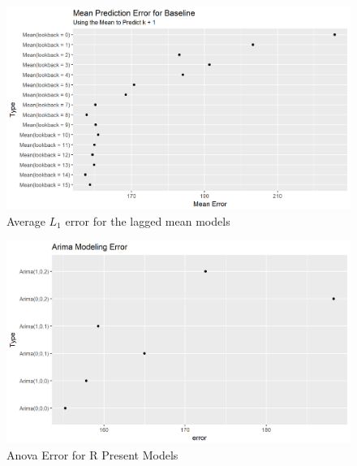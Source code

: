 \documentclass[11pt,a4paper]{article}
\begin{document}
\begin{figure}
	\centering
	\includegraphics[width=1\linewidth]{../figures/Lagged_Mean_Prediction_Results}
	\caption{Average $L_1$ error for the lagged mean models}
	\label{fig:laggedmeanpredictionresults}
\end{figure}
\begin{figure}
	\centering
	\includegraphics[width=1\linewidth]{../figures/Arima_Modeling_Error_Init}
	\caption{Anova Error for R Present Models}
	\label{fig:arimamodelingerrorinit}
\end{figure}





\end{document}
